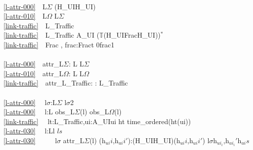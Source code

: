 {%
\bp
{}\\
\ref{l-attr-000}\ \ L$\Sigma$ {\EQ} (H\_UI{\TIMES}H\_UI)\\
\ref{l-attr-010}\ \ L$\Omega$ {\EQ} L$\Sigma$\ \ \\
\ref{link-traffic}\ \ L\_Traffic\ \ \ \ \ \ \ \\
\ref{link-traffic}\ \ L\_Traffic {\EQ} A\_UI {\MARROW} ($\mathbb{T}${\TIMES}(H\_UI{\TIMES}Frac{\TIMES}H\_UI))$^{\ast}$\ \ \ \ \ \ \\
\ref{link-traffic}\ \ Frac {\EQ} ,  frac:Fract {\RDOT} 0{\LT}frac{\LT}1\\
 \\
\ref{l-attr-000}\ \ attr\_L$\Sigma$: L {\RIGHTARROW} L$\Sigma$\\
\ref{l-attr-010}\ \ attr\_L$\Omega$: L {\RIGHTARROW} L$\Omega$\\
\ref{link-traffic}\ \ attr\_L\_Traffic: : {\RIGHTARROW} L\_Traffic\\
\\
\ref{l-attr-000}\ \ {\ALL} l$\sigma$:L$\Sigma${\RDOT} l$\sigma${\LEQ}2\\
\ref{l-attr-000}\ \ {\ALL} l:L {\RDOT} obs\_L$\Sigma$(l) {\ISIN} obs\_L$\Omega$(l)\\
\ref{link-traffic}\ \ {\ALL} lt:L\_Traffic,ui:A\_UI{\RDOT}ui {\ISIN}  ht {\DBLRIGHTARROW} time\_ordered(ht(ui))\\
\ref{l-attr-030}\ \ {\ALL} l:L{\RDOT}l {\ISIN} $ls$ {\DBLRIGHTARROW}\\
\ref{l-attr-030}\ \ \ \ \  l$\sigma$ {\EQ}attr\_L$\Sigma$(l)  {\ALL} (h$_{ui}i$,h$_{ui}i'$):(H\_UI{\TIMES}H\_UI){\RDOT}(h$_{ui}i$,h$_{ui}i'$){\ISIN} l$\sigma${\DBLRIGHTARROW}{\LBRACE}h$_{ui_i}$,h$_{ui_i}'${\RBRACE}{\SUBSETEQ}h$_{ui}s$ 
\ep
\pos{\emcii}{}\smallish\LLLL

}
